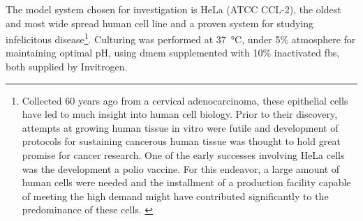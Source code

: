 The model system chosen for investigation is HeLa (ATCC CCL-2), the oldest and most wide spread human cell line and a proven system for studying infelicitous disease\footnote{Collected 60 years ago from a cervical adenocarcinoma, these epithelial cells have led to much insight into human cell biology. Prior to their discovery, attempts at growing human tissue in vitro were futile and development of protocols for sustaining cancerous human tissue was thought to hold great promise for cancer research. One of the early successes involving HeLa cells was the development a polio vaccine. For this endeavor, a large amount of human cells were needed and the installment of a production facility capable of meeting the high demand might have contributed significantly to the predominance of these cells. \citep{Masters2002}}. Culturing was performed at \SI{37}{\celsius}, under 5\%  atmosphere for maintaining optimal pH, using \gls{dmem}  supplemented with 10\% inactivated \gls{fbs}, both supplied by Invitrogen.


